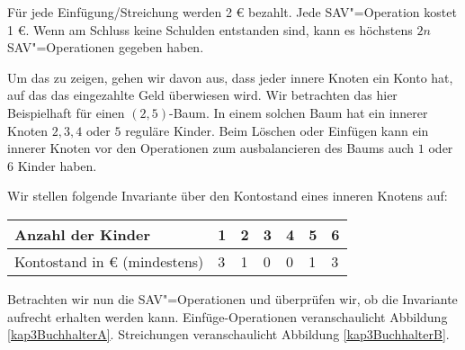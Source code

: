 \begin{Bew}
  \hspace{\parindent}Für jede Einfügung/Streichung werden 2 \euro{} bezahlt. Jede SAV"=Operation kostet 1 \euro{}. Wenn am Schluss keine Schulden entstanden sind, kann es höchstens $2n$ SAV"=Operationen gegeben haben.
  
  Um das zu zeigen, gehen wir davon aus, dass jeder innere Knoten ein Konto hat, auf das das eingezahlte Geld überwiesen wird. Wir betrachten das hier Beispielhaft für einen $(2,5)$-Baum. In einem solchen Baum hat ein innerer Knoten $2, 3, 4$ oder $5$ reguläre Kinder. Beim Löschen oder Einfügen kann ein innerer Knoten vor den Operationen zum ausbalancieren des Baums auch $1$ oder $6$ Kinder haben.

  Wir stellen folgende Invariante über den Kontostand eines inneren Knotens auf:
  \begin{center}
    \begin{tabular}{l|llllll}
      Anzahl der Kinder & 1 & 2 & 3 & 4 & 5 & 6\\\hline
      Kontostand in \euro{} (mindestens) & 3 & 1 & 0 & 0 & 1 & 3
    \end{tabular}
  \end{center}
  
  Betrachten wir nun die SAV"=Operationen und überprüfen wir, ob die Invariante aufrecht erhalten werden kann. Einfüge-Operationen veranschaulicht Abbildung \vref{kap3BuchhalterA}. Streichungen veranschaulicht Abbildung \vref{kap3BuchhalterB}.

\begin{figure}[hbtp]
  \centering
  
  
  

\end{figure}
\end{Bew}
